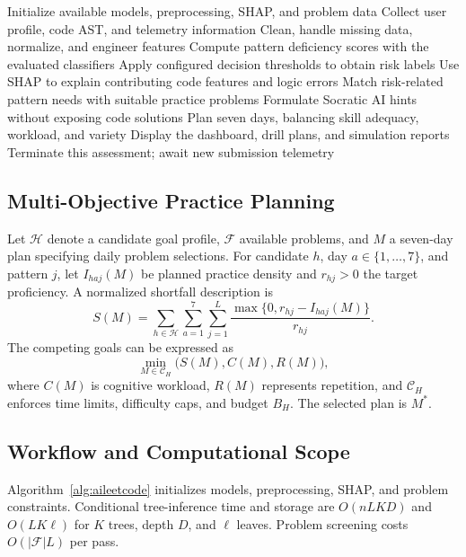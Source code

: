 \documentclass[conference]{IEEEtran}
\begin{document}
\begin{algorithm}[t]
\caption{AILeetCode assessment and Socratic planning}
\label{alg:aileetcode}
Initialize available models, preprocessing, SHAP, and problem data\;
Collect user profile, code AST, and telemetry information\;
Clean, handle missing data, normalize, and engineer features\;
Compute pattern deficiency scores with the evaluated classifiers\;
Apply configured decision thresholds to obtain risk labels\;
Use SHAP to explain contributing code features and logic errors\;
Match risk-related pattern needs with suitable practice problems\;
Formulate Socratic AI hints without exposing code solutions\;
Plan seven days, balancing skill adequacy, workload, and variety\;
Display the dashboard, drill plans, and simulation reports\;
Terminate this assessment; await new submission telemetry\;
\end{algorithm}

\subsection{Multi-Objective Practice Planning}
Let $\mathcal{H}$ denote a candidate goal profile, $\mathcal{F}$ available problems, and $M$ a seven-day plan specifying daily problem selections. For candidate $h$, day $a \in \{1, \dots, 7\}$, and pattern $j$, let $I_{haj}(M)$ be planned practice density and $r_{hj} > 0$ the target proficiency. A normalized shortfall description is
\begin{equation}
S(M) = \sum_{h \in \mathcal{H}} \sum_{a=1}^7 \sum_{j=1}^L \frac{\max\{0, r_{hj} - I_{haj}(M)\}}{r_{hj}}.
\end{equation}
The competing goals can be expressed as
\begin{equation}
\min_{M \in \mathcal{C}_H} \Big( S(M), C(M), R(M) \Big),
\end{equation}
where $C(M)$ is cognitive workload, $R(M)$ represents repetition, and $\mathcal{C}_H$ enforces time limits, difficulty caps, and budget $B_H$. The selected plan is $M^*$.

\subsection{Workflow and Computational Scope}
Algorithm~\ref{alg:aileetcode} initializes models, preprocessing, SHAP, and problem constraints. Conditional tree-inference time and storage are $O(nLKD)$ and $O(LK\ell)$ for $K$ trees, depth $D$, and $\ell$ leaves. Problem screening costs $O(|\mathcal{F}|L)$ per pass.
\end{document}

